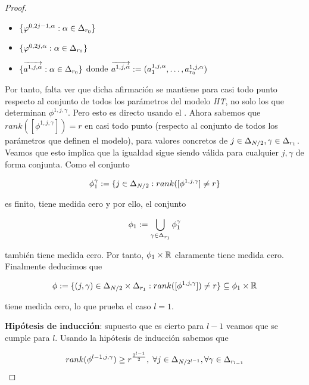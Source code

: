 \begin{proof}
    \begin{itemize}
        \item $\{ \varphi^{0, 2j - 1, \alpha}: \alpha \in \Delta_{r_0} \}$
        \item $\{ \varphi^{0, 2j, \alpha}: \alpha \in \Delta_{r_0} \}$
        \item $\{ \overrightarrow{a^{1, j, \alpha}} : \alpha \in \Delta_{r_0} \}$ donde $\overrightarrow{a^{1, j, \alpha}} := (a^{1, j, \alpha}_1, \ldots,  a^{1, j, \alpha}_{r_0})$
    \end{itemize}

    Por tanto, falta ver que dicha afirmación se mantiene para casi todo punto respecto al conjunto de todos los parámetros del modelo \textit{HT}, no solo los que determinan $\phi^{1, j, \gamma}$. Pero esto es directo usando el . Ahora sabemos que $rank([\phi^{1, j, \gamma}]) = r$ en casi todo punto (respecto al conjunto de todos los parámetros que definen el modelo), para valores concretos de $j \in \Delta_{N/2}, \gamma \in \Delta_{r_1}$. Veamos que esto implica que la igualdad sigue siendo válida para cualquier $j, \gamma$ de forma conjunta. Como el conjunto

    \begin{equation}
        \phi_1^\gamma := \{ j \in \Delta_{N/2}: rank([\phi^{1, j, \gamma}] \neq r \}
    \end{equation}

     es finito, tiene medida cero y por ello, el conjunto

     \begin{equation}
         \phi_1 := \bigcup_{\gamma \in \Delta_{r_1}} \phi_1^\gamma
     \end{equation}

     también tiene medida cero. Por tanto, $\phi_1 \times \mathbb{R}$ claramente tiene medida cero. Finalmente deducimos que

    \begin{equation}
        \phi := \{ (j, \gamma) \in \Delta_{N/2} \times \Delta_{r_1}: rank([\phi^{1, j, \gamma}]) \neq r \} \subseteq \phi_1 \times \mathbb{R}
    \end{equation}

    tiene medida cero, lo que prueba el caso $l = 1$.

    \textbf{Hipótesis de inducción}: supuesto que es cierto para $l - 1$ veamos que se cumple para $l$. Usando la hipótesis de inducción sabemos que

    \begin{equation}
        rank(\phi^{l-1, j, \gamma}) \geq r^{\frac{2^{l - 1}}{2}},
        \; \forall j \in \Delta_{N/2^{l-1}}, \forall \gamma \in \Delta_{r_{l-1}}
    \end{equation}


\end{proof}
